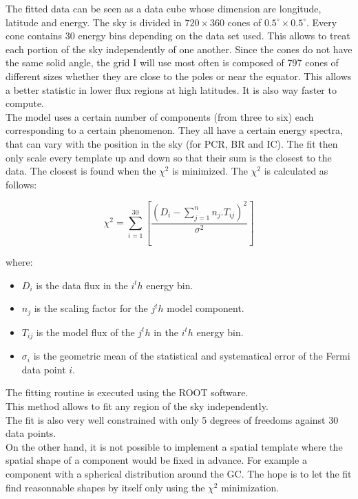 The fitted data can be seen as a data cube whose dimension are longitude, latitude and energy. The sky is divided in $720\times360$ cones of $ 0.5^\circ \times 0.5^\circ $. Every cone contains 30 energy bins depending on the data set used. This allows to treat each portion of the sky independently of one another. Since the cones do not have the same solid angle, the grid I will use most often is composed of 797 cones of different sizes whether they are close to the poles or near the equator. This allows a better statistic in lower flux regions at high latitudes. It is also way faster to compute. \\

The model uses a certain number of components (from three to six) each corresponding to a certain phenomenon. They all have a certain energy spectra, that can vary with the position in the sky (for PCR, BR and IC). The fit then only scale every template up and down so that their sum is the closest to the data. The closest is found when the $\chi ^2$ is minimized. The $\chi ^2$ is calculated as follows:

\begin{equation}
\chi ^2 = \sum_{i=1}^{30}[\frac{(D_i - \sum_{j=1}^{n}n_j.T_{ij})^2}{\sigma^2}]
\end{equation}

where:
\begin{itemize}
\item $D_i$ is the data flux in the $i^th$ energy bin.
\item $n_j$ is the scaling factor for the $j^th$ model component.
\item $T_{ij}$ is the model flux of the $j^th$ in the $i^th$ energy bin.
\item $\sigma_i$ is the geometric mean of the statistical and systematical error of the Fermi data point $i$.
\end{itemize}

The fitting routine is executed using the ROOT software. \\

This method allows to fit any region of the sky independently.\\

The fit is also very well constrained with only 5 degrees of freedoms against 30 data points.\\

On the other hand, it is not possible to implement a spatial template where the spatial shape of a component would be fixed in advance. For example a component with a spherical distribution around the GC. The hope is to let the fit find reasonnable shapes by itself only using the $\chi ^2$ minimization.\\

